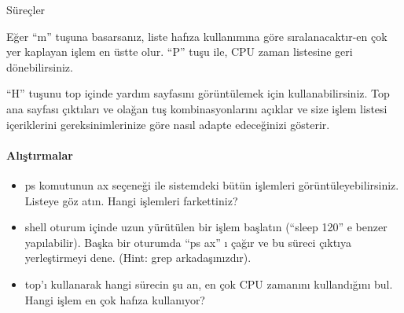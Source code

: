 \begin{section}{Süreçler}
\begin{itemize}
Eğer “m” tuşuna basarsanız, liste hafıza kullanımına göre sıralanacaktır-en çok yer kaplayan işlem en üstte olur. “P” tuşu ile, CPU zaman listesine geri dönebilirsiniz.

“H” tuşunu  top içinde yardım sayfasını görüntülemek için kullanabilirsiniz. Top ana sayfası çıktıları ve olağan tuş kombinasyonlarını açıklar ve size işlem listesi içeriklerini gereksinimlerinize göre nasıl adapte edeceğinizi gösterir.
\end{itemize}
\paragraph{Alıştırmalar}{
\begin{itemize}
 \item ps komutunun ax seçeneği ile sistemdeki bütün işlemleri görüntüleyebilirsiniz. Listeye göz atın. Hangi işlemleri farkettiniz?
 \item shell oturum içinde uzun yürütülen bir işlem başlatın (“sleep 120” e benzer yapılabilir). Başka bir oturumda  “ps ax” ı çağır ve bu süreci çıktıya 
yerleştirmeyi dene. (Hint: grep arkadaşınızdır).
\item top'ı kullanarak hangi sürecin şu an, en çok CPU zamanını kullandığını bul. Hangi işlem en çok hafıza kullanıyor?
\end{itemize}}
\end{section}

